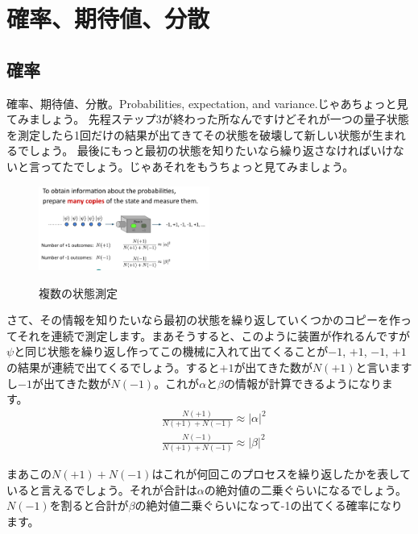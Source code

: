 \section{確率、期待値、分散}
\subsection{確率}
確率、期待値、分散。Probabilities, expectation, and variance.じゃあちょっと見てみましょう。
先程ステップ3が終わった所なんですけどそれが一つの量子状態を測定したら1回だけの結果が出てきてその状態を破壊して新しい状態が生まれるでしょう。
最後にもっと最初の状態を知りたいなら繰り返さなければいけないと言ってたでしょう。じゃあそれをもうちょっと見てみましょう。
\begin{figure}[H]
    \centering
    \includegraphics[width=0.5\textwidth]{lesson2/many_copies_machine.pdf}
    \label{fig: 1}
    \begin{center}
        \caption{複数の状態測定}
    \end{center}
\end{figure}
さて、その情報を知りたいなら最初の状態を繰り返していくつかのコピーを作ってそれを連続で測定します。まあそうすると、このように装置が作れるんですが
$\psi$と同じ状態を繰り返し作ってこの機械に入れて出てくることが$-1$, $+1$, $-1$, $+1$の結果が連続で出てくるでしょう。すると$+1$が出てきた数が$N(+1)$と言いますし$-1$が出てきた数が$N(-1)$。これが$\alpha$と$\beta$の情報が計算できるようになります。
\begin{equation}
\begin{aligned}
&\frac{N(+1)}{N(+1)+N(-1)} \approx|\alpha|^{2} \\
&\frac{N(-1)}{N(+1)+N(-1)} \approx|\beta|^{2}
\end{aligned}
\end{equation}

まあこの$N(+1) + N(-1)$はこれが何回このプロセスを繰り返したかを表していると言えるでしょう。それが合計は$\alpha$の絶対値の二乗ぐらいになるでしょう。$N(-1)$を割ると合計が$\beta$の絶対値二乗ぐらいになって-1の出てくる確率になります。

